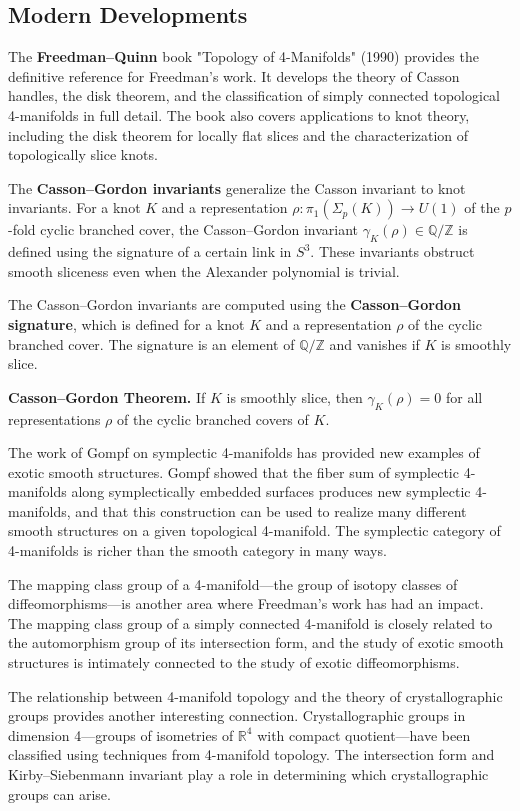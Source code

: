 \subsection*{Modern Developments}

The \textbf{Freedman--Quinn} book "Topology of 4-Manifolds" (1990) provides the definitive reference for Freedman's work. It develops the theory of Casson handles, the disk theorem, and the classification of simply connected topological 4-manifolds in full detail. The book also covers applications to knot theory, including the disk theorem for locally flat slices and the characterization of topologically slice knots.

The \textbf{Casson--Gordon invariants} generalize the Casson invariant to knot invariants. For a knot $K$ and a representation $\rho: \pi_1(\Sigma_p(K)) \to U(1)$ of the $p$-fold cyclic branched cover, the Casson--Gordon invariant $\gamma_K(\rho) \in \mathbb{Q}/\mathbb{Z}$ is defined using the signature of a certain link in $S^3$. These invariants obstruct smooth sliceness even when the Alexander polynomial is trivial.

The Casson--Gordon invariants are computed using the \textbf{Casson--Gordon signature}, which is defined for a knot $K$ and a representation $\rho$ of the cyclic branched cover. The signature is an element of $\mathbb{Q}/\mathbb{Z}$ and vanishes if $K$ is smoothly slice.

\textbf{Casson--Gordon Theorem.} If $K$ is smoothly slice, then $\gamma_K(\rho) = 0$ for all representations $\rho$ of the cyclic branched covers of $K$.

The work of Gompf on symplectic 4-manifolds has provided new examples of exotic smooth structures. Gompf showed that the fiber sum of symplectic 4-manifolds along symplectically embedded surfaces produces new symplectic 4-manifolds, and that this construction can be used to realize many different smooth structures on a given topological 4-manifold. The symplectic category of 4-manifolds is richer than the smooth category in many ways.

The mapping class group of a 4-manifold---the group of isotopy classes of diffeomorphisms---is another area where Freedman's work has had an impact. The mapping class group of a simply connected 4-manifold is closely related to the automorphism group of its intersection form, and the study of exotic smooth structures is intimately connected to the study of exotic diffeomorphisms.

The relationship between 4-manifold topology and the theory of crystallographic groups provides another interesting connection. Crystallographic groups in dimension 4---groups of isometries of $\mathbb{R}^4$ with compact quotient---have been classified using techniques from 4-manifold topology. The intersection form and Kirby--Siebenmann invariant play a role in determining which crystallographic groups can arise.

